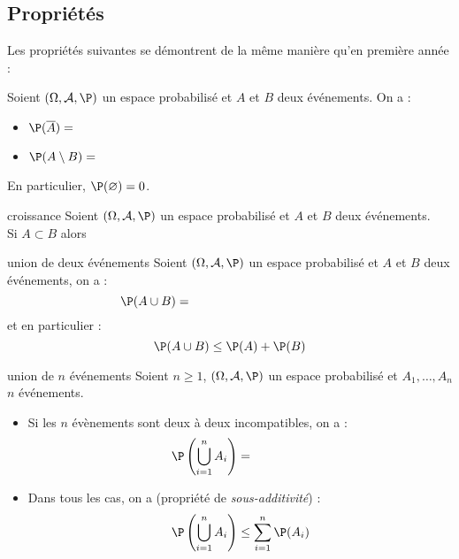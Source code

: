 \documentclass[a4paper,10pt]{report}
\begin{document}
\begin{enumerate}
 




\subsection{Propriétés}
Les propriétés suivantes se démontrent de la même manière qu'en première année : 

\begin{Proposition}{}\label{Prop1}
Soient $(\Omega, \mathcal{A}, \P)$ un espace probabilisé et $A$ et $B$ deux événements. On a :
\begin{itemize}
\item $\P(\overline{A})=$\phantom{$1-P(A)$.}
\item $\P(A \setminus B) =$\phantom{$\P(A)-P(A \cap B)$.}
\end{itemize}
\end{Proposition}

\begin{Remarque}{}
 En particulier, $\P(\varnothing)= 0$.
\end{Remarque}

\begin{Proposition}{croissance}
Soient $(\Omega, \mathcal{A}, \P)$ un espace probabilisé et $A$ et $B$ deux événements.\\
Si $A \subset B$ alors $\phantom{\P(A) \leq \P(B)}$
\end{Proposition}

\begin{Theoreme}{union de deux événements}
Soient $(\Omega, \mathcal{A}, \P)$ un espace probabilisé et $A$ et $B$ deux événements, on a :
$$\P(A \cup B)=\phantom{\P(A)+\P(B)-P(A \cap B)}$$
et en particulier :
$$ \P(A \cup B) \leq \P(A) + \P(B)$$
\end{Theoreme}

\begin{Theoreme}{union de $n$ événements}
Soient $n \geq 1$, $(\Omega, \mathcal{A}, \P)$ un espace probabilisé et $A_1, \ldots, A_n$ $n$ événements.
\begin{itemize}
\item Si les $n$ évènements sont deux à deux incompatibles, on a :
$$\P \left( \bigcup_{i=1}^n A_i\right)= \phantom{\sum_{i=1}^n \P(A_i)}$$
\item Dans tous les cas, on a (propriété de \emph{sous-additivité}) :
$$ \P \left(\bigcup_{i=1}^n A_i \right) \leq \sum_{i=1}^n \P(A_i) $$
\end{itemize}
\end{Theoreme}


\end{enumerate}
\end{document}
